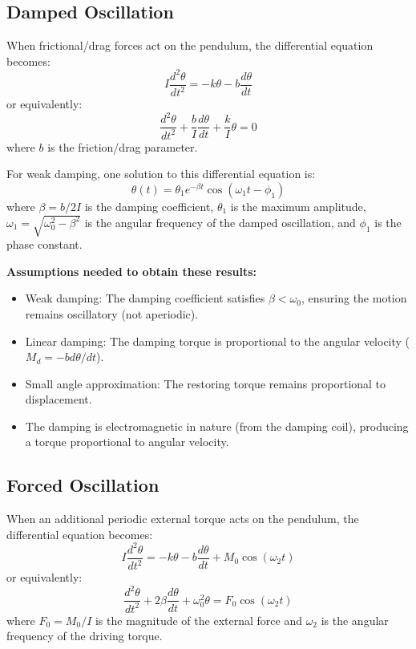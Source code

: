 \documentclass[12pt]{article}
\begin{document}
\subsection{Damped Oscillation}

When frictional/drag forces act on the pendulum, the differential equation becomes:
\begin{equation}
I \frac{d^2\theta}{dt^2} = -k\theta - b\frac{d\theta}{dt}
\end{equation}
or equivalently:
\begin{equation}
\frac{d^2\theta}{dt^2} + \frac{b}{I}\frac{d\theta}{dt} + \frac{k}{I}\theta = 0
\end{equation}
where $b$ is the friction/drag parameter.

For weak damping, one solution to this differential equation is:
\begin{equation}
\theta(t) = \theta_1 e^{-\beta t} \cos(\omega_1 t - \phi_1)
\end{equation}
where $\beta = b/2I$ is the damping coefficient, $\theta_1$ is the maximum amplitude, $\omega_1 = \sqrt{\omega_0^2 - \beta^2}$ is the angular frequency of the damped oscillation, and $\phi_1$ is the phase constant.

\textbf{Assumptions needed to obtain these results:}
\begin{itemize}[leftmargin=*]
\item Weak damping: The damping coefficient satisfies $\beta < \omega_0$, ensuring the motion remains oscillatory (not aperiodic).
\item Linear damping: The damping torque is proportional to the angular velocity ($M_d = -b d\theta/dt$).
\item Small angle approximation: The restoring torque remains proportional to displacement.
\item The damping is electromagnetic in nature (from the damping coil), producing a torque proportional to angular velocity.
\end{itemize}

\subsection{Forced Oscillation}

When an additional periodic external torque acts on the pendulum, the differential equation becomes:
\begin{equation}
I \frac{d^2\theta}{dt^2} = -k\theta - b\frac{d\theta}{dt} + M_0\cos(\omega_2 t)
\end{equation}
or equivalently:
\begin{equation}
\frac{d^2\theta}{dt^2} + 2\beta\frac{d\theta}{dt} + \omega_0^2\theta = F_0\cos(\omega_2 t)
\end{equation}
where $F_0 = M_0/I$ is the magnitude of the external force and $\omega_2$ is the angular frequency of the driving torque.
\end{document}
